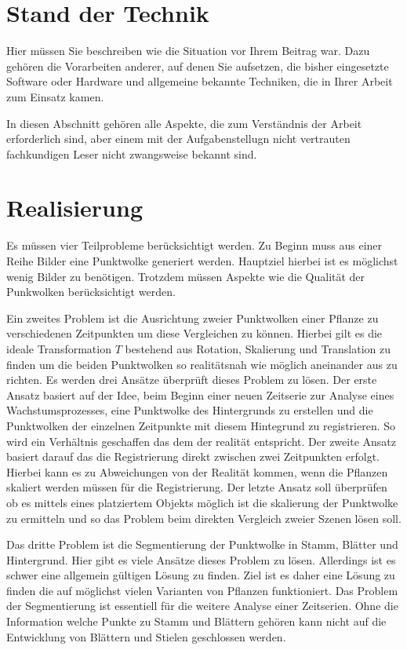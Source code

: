 \documentclass[12pt,titlepage,twoside]{article}
\begin{document}
\newpage
\section{Stand der Technik}
\label{sec:stand}
Hier müssen Sie beschreiben wie die Situation vor Ihrem Beitrag war.
Dazu gehören die Vorarbeiten anderer, auf denen Sie aufsetzen, die
bisher eingesetzte Software oder Hardware und allgemeine
bekannte Techniken, die in Ihrer Arbeit zum Einsatz kamen.

In diesen Abschnitt gehören alle Aspekte, die zum Verständnis der
Arbeit erforderlich sind, aber einem mit der Aufgabenstellugn nicht vertrauten
fachkundigen Leser nicht zwangsweise bekannt sind.

\newpage
\section{Realisierung}
\label{sec:realisierung}
Es müssen vier Teilprobleme berücksichtigt werden. Zu Beginn muss aus einer Reihe Bilder eine Punktwolke generiert werden. Hauptziel hierbei ist es möglichst wenig Bilder zu benötigen. 
Trotzdem müssen Aspekte wie die Qualität der Punkwolken berücksichtigt werden. 

Ein zweites Problem ist die Ausrichtung zweier Punktwolken einer Pflanze zu verschiedenen Zeitpunkten um diese Vergleichen zu können. 
Hierbei gilt es die ideale Transformation $T$ bestehend aus Rotation, Skalierung und Translation zu finden um die beiden Punktwolken so realitätsnah wie möglich aneinander aus zu richten.
Es werden drei Ansätze überprüft dieses Problem zu lösen. 
Der erste Ansatz basiert auf der Idee, beim Beginn einer neuen Zeitserie zur Analyse eines Wachstumsprozesses, eine Punktwolke des Hintergrunds zu erstellen und die Punktwolken der einzelnen Zeitpunkte mit diesem Hintegrund zu registrieren. So wird ein Verhältnis geschaffen das dem der realität entspricht.
Der zweite Ansatz basiert darauf das die Registrierung direkt zwischen zwei Zeitpunkten erfolgt. Hierbei kann es zu Abweichungen von der Realität kommen, wenn die Pflanzen skaliert werden müssen für die Registrierung.
Der letzte Ansatz soll überprüfen ob es mittels eines platziertem Objekts möglich ist die skalierung der Punktwolke zu ermitteln und so das Problem beim direkten Vergleich zweier Szenen lösen soll.

Das dritte Problem ist die Segmentierung der Punktwolke in Stamm, Blätter und Hintergrund. Hier gibt es viele Ansätze dieses Problem zu lösen. Allerdings ist es schwer eine allgemein gültigen Lösung zu finden. 
Ziel ist es daher eine Lösung zu finden die auf möglichst vielen Varianten von Pflanzen funktioniert. 
Das Problem der Segmentierung ist essentiell für die weitere Analyse einer Zeitserien. Ohne die Information welche Punkte zu Stamm und Blättern gehören kann nicht auf die Entwicklung von Blättern und Stielen geschlossen werden.
\end{document}
